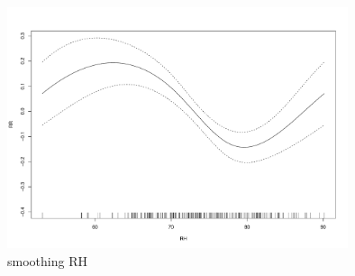 \documentclass[a4paper, 12pt]{article}
\begin{document}
\begin{figure}
       \includegraphics[width=10cm]{RHSMOOTH}
      \caption{smoothing RH}
\end{figure}
\end{document}
